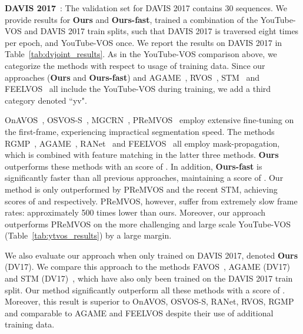\noindent\textbf{DAVIS 2017}~\cite{perazzi2016davis}: The validation set for DAVIS 2017 contains 30 sequences. We provide results for {\bf Ours} and {\bf Ours-fast}, trained a combination of the YouTube-VOS and DAVIS 2017 train splits, such that DAVIS 2017 is traversed eight times per epoch, and YouTube-VOS once. We report the results on DAVIS 2017 in Table~\ref{tab:dvjoint_results}. As in the YouTube-VOS comparison above, we categorize the methods with respect to usage of training data. Since our approaches ({\bf Ours} and {\bf Ours-fast}) and AGAME~\cite{johnander2018generative}, RVOS~\cite{ventura2019rvos}, STM~\cite{oh2019video} and FEELVOS~\cite{voigtlaender2018feelvos} all include the YouTube-VOS during training, we add a third category denoted ``yv".

OnAVOS~\cite{voigtlaender2017onavos}, OSVOS-S~\cite{maninis2017osvos_s}, MGCRN~\cite{hu2018mgcrn}, PReMVOS~\cite{luiten2018premvos} employ extensive fine-tuning on the first-frame, experiencing impractical segmentation speed. The methods RGMP~\cite{oh2018rgmp}, AGAME~\cite{johnander2018generative}, RANet~\cite{wang2019ranet} and FEELVOS~\cite{voigtlaender2018feelvos} all employ mask-propagation, which is combined with feature matching in the latter three methods. {\bf Ours} outperforms these methods with an  score of . In addition, {\bf Ours-fast} is significantly faster than all previous approaches, maintaining a  score of . 
Our method is only outperformed by PReMVOS and the recent STM, achieving  scores of  and  respectively. PReMVOS, however, suffer from extremely slow frame rates: approximately 500 times lower than ours. Moreover, our approach outperforms PReMVOS on the more challenging and large scale YouTube-VOS (Table~\ref{tab:ytvos_results}) by a large margin.


We also evaluate our approach when only trained on DAVIS 2017, denoted {\bf Ours} (DV17). We compare this approach to the methods FAVOS~\cite{cheng2018favos}, AGAME (DV17)~\cite{johnander2018generative} and STM  (DV17)~\cite{oh2019video}, which have also only been trained on the DAVIS 2017 train split. Our method significantly outperform all these methods with a  score of . Moreover, this result is superior to OnAVOS, OSVOS-S, RANet, RVOS, RGMP and comparable to AGAME and FEELVOS despite their use of additional training data.


